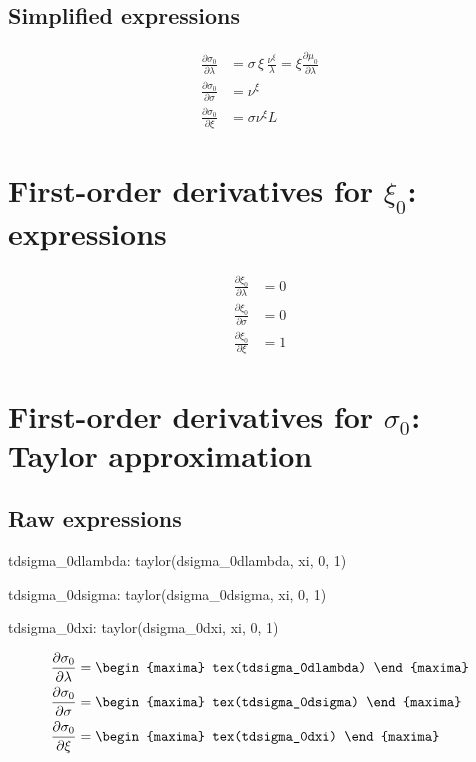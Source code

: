\subsection*{Simplified expressions}

{\color{red}
\begin{align*}
  \frac{\partial \sigma_0}{\partial \lambda}
  &= \sigma \, \xi \, \frac{\nu^\xi}{\lambda} = \xi \frac{\partial \mu_0}{\partial \lambda}\\
 \frac{\partial \sigma_0}{\partial \sigma}
  &= \nu^\xi\\
  \frac{\partial \sigma_0 }{\partial \xi}
  &= \sigma \nu^\xi L 
\end{align*}
}

\section{First-order derivatives for $\xi_0$: expressions}

{\color{red}
\begin{align*}
  \frac{\partial \xi_0}{\partial \lambda}
  &= 0\\
 \frac{\partial \xi_0}{\partial \sigma}
  &= 0\\
  \frac{\partial \xi_0 }{\partial \xi}
  &= 1
\end{align*}
}

\section{First-order derivatives for $\sigma_0$: Taylor approximation}

\subsection*{Raw expressions}
\begin{maxima}
  tdsigma_0dlambda: taylor(dsigma_0dlambda, xi, 0, 1)
\end{maxima}
\begin{maxima}
  tdsigma_0dsigma: taylor(dsigma_0dsigma, xi, 0, 1)
\end{maxima}
\begin{maxima}
  tdsigma_0dxi: taylor(dsigma_0dxi, xi, 0, 1)
\end{maxima}

{\color{MonVertF}
\begin{align*}
  \frac{\partial \sigma_0}{\partial \lambda}
  &=
\begin{maxima}
  tex(tdsigma_0dlambda)
\end{maxima}\\
 \frac{\partial \sigma_0}{\partial \sigma}
  &=
\begin{maxima}
  tex(tdsigma_0dsigma)
\end{maxima}\\
\frac{\partial \sigma_0 }{\partial \xi}
  &=
\begin{maxima}
  tex(tdsigma_0dxi)
\end{maxima}
\end{align*}
}

